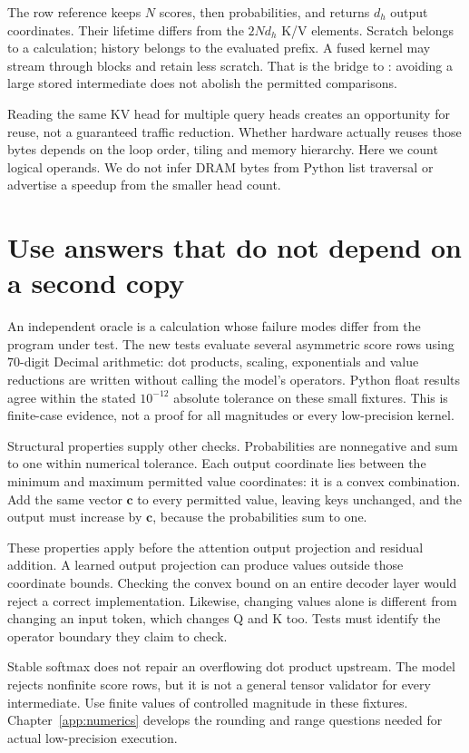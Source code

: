 The row reference keeps $N$ scores, then probabilities, and returns
$d_h$ output coordinates. Their lifetime differs from the $2Nd_h$
K/V elements. Scratch belongs to a calculation; history belongs to the
evaluated prefix. A fused kernel may stream through blocks and retain
less scratch. That is the bridge to : avoiding a
large stored intermediate does not abolish the permitted comparisons.

Reading the same KV head for multiple query heads creates an opportunity
for reuse, not a guaranteed traffic reduction. Whether hardware actually
reuses those bytes depends on the loop order, tiling and memory hierarchy.
Here we count logical operands. We do not infer DRAM bytes from Python
list traversal or advertise a speedup from the smaller head count.

\section{Use answers that do not depend on a second copy}
An independent oracle is a calculation whose failure modes differ from
the program under test. The new tests evaluate several asymmetric score
rows using 70-digit Decimal arithmetic: dot products, scaling,
exponentials and value reductions are written without calling the model's
operators. Python float results agree within the stated $10^{-12}$
absolute tolerance on these small fixtures. This is finite-case evidence,
not a proof for all magnitudes or every low-precision kernel.

Structural properties supply other checks. Probabilities are nonnegative
and sum to one within numerical tolerance. Each output coordinate lies
between the minimum and maximum permitted value coordinates: it is a
convex combination. Add the same vector $\mathbf c$ to every permitted
value, leaving keys unchanged, and the output must increase by
$\mathbf c$, because the probabilities sum to one.

These properties apply before the attention output projection and residual
addition. A learned output projection can produce values outside those
coordinate bounds. Checking the convex bound on an entire decoder layer
would reject a correct implementation. Likewise, changing values alone
is different from changing an input token, which changes Q and K too.
Tests must identify the operator boundary they claim to check.

Stable softmax does not repair an overflowing dot product upstream.
The model rejects nonfinite score rows, but it is not a general tensor
validator for every intermediate. Use finite values of controlled
magnitude in these fixtures. Chapter~\ref{app:numerics} develops the
rounding and range questions needed for actual low-precision execution.

